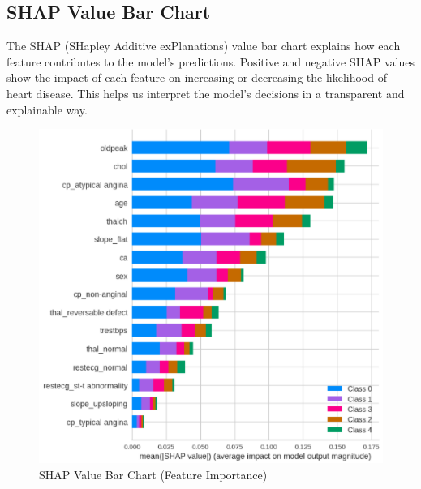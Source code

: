 \documentclass[journal]{IEEEtran}
\begin{document}
\subsection{SHAP Value Bar Chart}
The SHAP (SHapley Additive exPlanations) value bar chart explains how each feature contributes to the model’s predictions. Positive and negative SHAP values show the impact of each feature on increasing or decreasing the likelihood of heart disease. This helps us interpret the model’s decisions in a transparent and explainable way.
\begin{figure}[h]
    \centering
    \includegraphics[width=1\linewidth]{images/SHAP Value Bar Chart (Feature Importance).png}
    \caption{SHAP Value Bar Chart (Feature Importance)}
    \label{fig:shap-bar-chart}
\end{figure}
\end{document}
